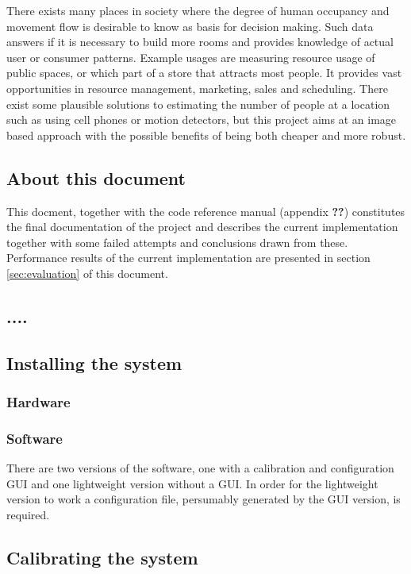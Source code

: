 There exists many places in society where the degree of human occupancy and movement flow is desirable to know as basis for decision making. Such data answers if it is necessary to build more rooms and provides knowledge of actual user or consumer patterns. Example usages are measuring resource usage of public spaces, or which part of a store that attracts most people. It provides vast opportunities in resource management, marketing, sales and scheduling. There exist some plausible solutions to estimating the number of people at a location such as using cell phones or motion detectors, but this project aims at an image based approach with the possible benefits of being both cheaper and more robust.

\subsection{About this document}
This docment, together with the code reference manual (appendix \textbf{??}) constitutes the final documentation of the project and describes the current implementation together with some failed attempts and conclusions drawn from these. Performance results of the current implementation are presented in section \ref{sec:evaluation} of this document.

\subsection{....}

\subsection{Installing the system}
\subsubsection{Hardware}
\subsubsection{Software}
There are two versions of the software, one with a calibration and configuration GUI and one lightweight version without a GUI. In order for the lightweight version to work a configuration file, persumably generated by the GUI version, is required.

\subsection{Calibrating the system}
